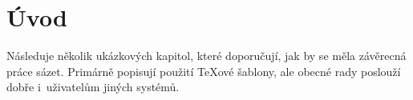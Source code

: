 \chapter*{Úvod}

Následuje několik ukázkových kapitol, které doporučují, jak by se
měla závěrecná práce sázet. Primárně popisují použití \TeX{}ové
šablony, ale obecné rady poslouží dobře i~uživatelům jiných
systémů.
